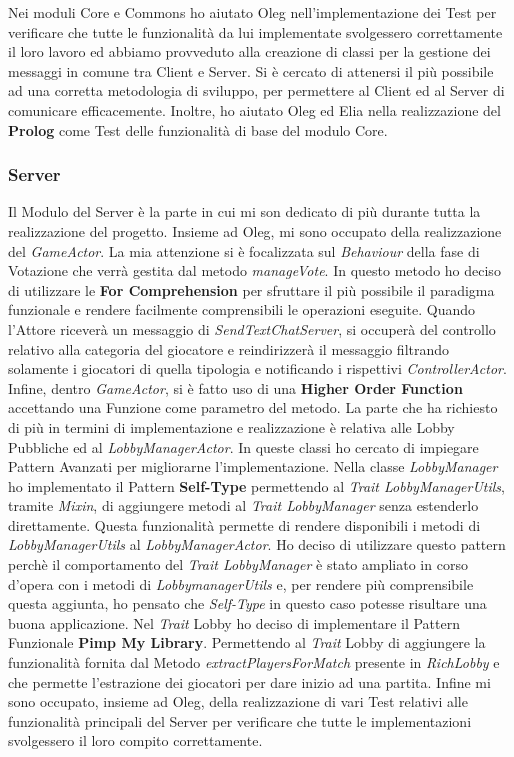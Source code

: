 Nei moduli Core e Commons ho aiutato Oleg nell'implementazione dei Test per verificare che tutte le funzionalit\`a da lui implementate svolgessero correttamente il loro lavoro ed abbiamo provveduto alla creazione di classi per la gestione dei messaggi in comune tra Client e Server. Si \`e cercato di attenersi il pi\`u possibile ad una corretta metodologia di sviluppo, per permettere al Client ed al Server di comunicare efficacemente. Inoltre, ho aiutato Oleg ed Elia nella realizzazione del \textbf{Prolog} come Test delle funzionalit\`a di base del modulo Core.

\subsubsection{Server}

Il Modulo del Server \`e la parte in cui mi son dedicato di pi\`u durante tutta la realizzazione del progetto. Insieme ad Oleg, mi sono occupato della realizzazione del \textit{GameActor}. La mia attenzione si \`e focalizzata sul \textit{Behaviour} della fase di Votazione che verr\`a gestita dal metodo \textit{manageVote}. In questo metodo ho deciso di utilizzare le \textbf{For Comprehension} per sfruttare il pi\`u possibile il paradigma funzionale e rendere facilmente comprensibili le operazioni eseguite. Quando l'Attore ricever\`a un messaggio di \textit{SendTextChatServer}, si occuper\`a del controllo relativo alla categoria del giocatore e reindirizzer\`a il messaggio filtrando solamente i giocatori di quella tipologia e notificando i rispettivi \textit{ControllerActor}. Infine, dentro \textit{GameActor}, si \`e fatto uso di una \textbf{Higher Order Function} accettando una Funzione come parametro del metodo. La parte che ha richiesto di pi\`u in termini di implementazione e realizzazione \`e relativa alle Lobby Pubbliche ed al \textit{LobbyManagerActor}. In queste classi ho cercato di impiegare Pattern Avanzati per migliorarne l'implementazione. Nella classe \textit{LobbyManager} ho implementato il Pattern \textbf{Self-Type} permettendo al \textit{Trait LobbyManagerUtils}, tramite \textit{Mixin}, di aggiungere metodi al \textit{Trait LobbyManager} senza estenderlo direttamente. Questa funzionalit\`a permette di rendere disponibili i metodi di \textit{LobbyManagerUtils} al \textit{LobbyManagerActor}. Ho deciso di utilizzare questo pattern perch\`e il comportamento del \textit{Trait LobbyManager} \`e stato ampliato in corso d'opera con i metodi di \textit{LobbymanagerUtils} e, per rendere pi\`u comprensibile questa aggiunta, ho pensato che \textit{Self-Type} in questo caso potesse risultare una buona applicazione. Nel \textit{Trait} Lobby ho deciso di implementare il Pattern Funzionale \textbf{Pimp My Library}. Permettendo al \textit{Trait} Lobby di aggiungere la funzionalit\`a fornita dal Metodo \textit{extractPlayersForMatch} presente in \textit{RichLobby} e che permette l'estrazione dei giocatori per dare inizio ad una partita. Infine mi sono occupato, insieme ad Oleg, della realizzazione di vari Test relativi alle funzionalit\`a principali del Server per verificare che tutte le implementazioni svolgessero il loro compito correttamente.
